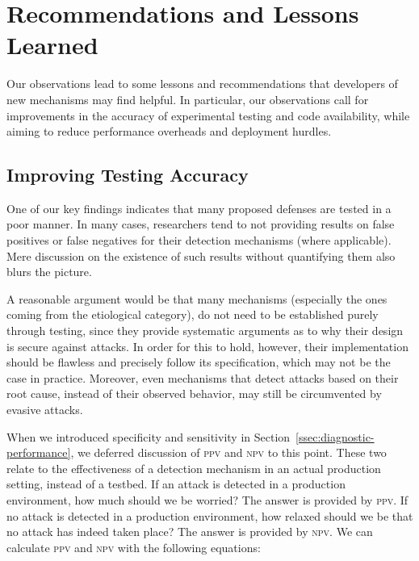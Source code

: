 \documentclass[conference]{IEEEtran}
\begin{document}
\section{Recommendations and Lessons Learned}
\label{sec:lessons-learned}

Our observations lead to some lessons and recommendations that
developers of new mechanisms may find helpful. In particular,
our observations
call for improvements in the accuracy of experimental testing
and code availability, while
aiming to reduce performance overheads and deployment hurdles.


\subsection{Improving Testing Accuracy}

One of our key findings indicates that many proposed defenses are
tested in a poor manner. In many cases, researchers tend to not providing
results on false positives or false negatives for their detection mechanisms
(where applicable).
Mere discussion on the existence of such results without quantifying
them also blurs the picture.

A reasonable argument would be that many mechanisms (especially the
ones coming from the etiological category), do not need to be
established purely through testing, since they provide systematic
arguments as to why their design is secure against attacks. In order
for this to hold, however, their implementation should be flawless
and precisely follow its specification, which may not
be the case in practice. Moreover, even mechanisms that detect attacks
based on their root cause, instead of their observed behavior, may still be
circumvented by evasive attacks.

When we introduced specificity and sensitivity in
Section~\ref{ssec:diagnostic-performance}, we deferred discussion of
\textsc{ppv} and \textsc{npv} to this point. These two relate to the
effectiveness of a detection mechanism in an actual production setting,
instead of a testbed. If an attack is detected in a production
environment, how much should we be worried? The answer is provided by
\textsc{ppv}. If no attack is detected in a production environment,
how relaxed should we be that no attack has indeed taken place? The
answer is provided by \textsc{npv}. We can calculate \textsc{ppv} and
\textsc{npv} with the following equations:
\end{document}
